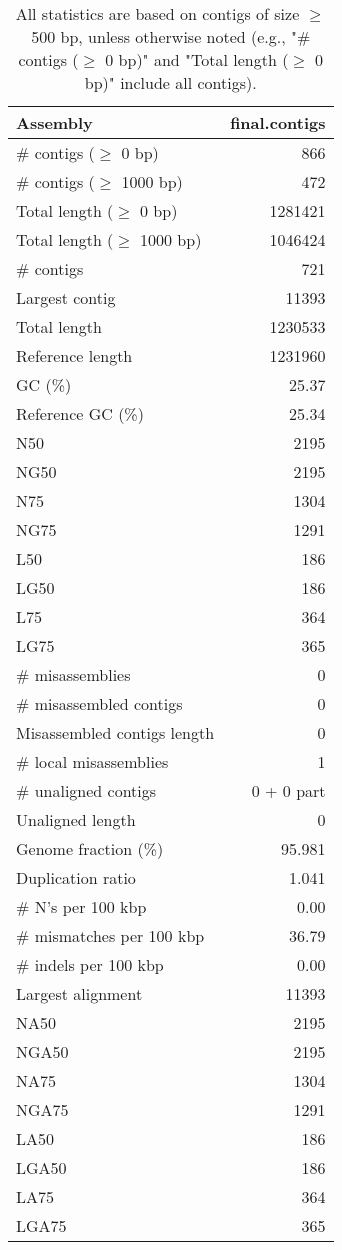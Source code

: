 \documentclass[12pt,a4paper]{article}
\begin{document}
\begin{table}[ht]
\begin{center}
\caption{All statistics are based on contigs of size $\geq$ 500 bp, unless otherwise noted (e.g., "\# contigs ($\geq$ 0 bp)" and "Total length ($\geq$ 0 bp)" include all contigs).}
\begin{tabular}{|l*{1}{|r}|}
\hline
Assembly & final.contigs \\ \hline
\# contigs ($\geq$ 0 bp) & 866 \\ \hline
\# contigs ($\geq$ 1000 bp) & 472 \\ \hline
Total length ($\geq$ 0 bp) & 1281421 \\ \hline
Total length ($\geq$ 1000 bp) & 1046424 \\ \hline
\# contigs & 721 \\ \hline
Largest contig & 11393 \\ \hline
Total length & 1230533 \\ \hline
Reference length & 1231960 \\ \hline
GC (\%) & 25.37 \\ \hline
Reference GC (\%) & 25.34 \\ \hline
N50 & 2195 \\ \hline
NG50 & 2195 \\ \hline
N75 & 1304 \\ \hline
NG75 & 1291 \\ \hline
L50 & 186 \\ \hline
LG50 & 186 \\ \hline
L75 & 364 \\ \hline
LG75 & 365 \\ \hline
\# misassemblies & 0 \\ \hline
\# misassembled contigs & 0 \\ \hline
Misassembled contigs length & 0 \\ \hline
\# local misassemblies & 1 \\ \hline
\# unaligned contigs & 0 + 0 part \\ \hline
Unaligned length & 0 \\ \hline
Genome fraction (\%) & 95.981 \\ \hline
Duplication ratio & 1.041 \\ \hline
\# N's per 100 kbp & 0.00 \\ \hline
\# mismatches per 100 kbp & 36.79 \\ \hline
\# indels per 100 kbp & 0.00 \\ \hline
Largest alignment & 11393 \\ \hline
NA50 & 2195 \\ \hline
NGA50 & 2195 \\ \hline
NA75 & 1304 \\ \hline
NGA75 & 1291 \\ \hline
LA50 & 186 \\ \hline
LGA50 & 186 \\ \hline
LA75 & 364 \\ \hline
LGA75 & 365 \\ \hline
\end{tabular}
\end{center}
\end{table}
\end{document}
